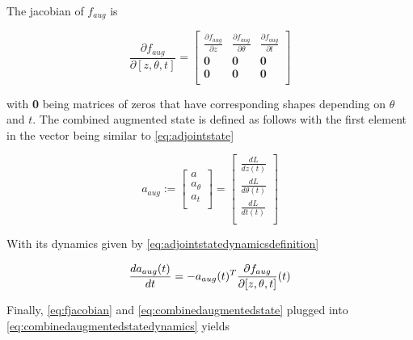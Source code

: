 \documentclass[10pt]{reportMaster}
\begin{document}
The jacobian of $f_{aug}$ is 

\begin{equation}
\label{eq:fjacobian}
\frac{\partial f_{aug}}{\partial [z, \theta, t]} = 
\begin{bmatrix}
\frac{\partial f_{aug}}{\partial z} & \frac{\partial f_{aug}}{\partial \theta}  & \frac{\partial f_{aug}}{\partial t} \\
\textbf{0} & \textbf{0} & \textbf{0} \\
\textbf{0} & \textbf{0} & \textbf{0} \\
\end{bmatrix}
\end{equation}

with \textbf{0} being matrices of zeros that have corresponding shapes depending on $\theta$ and $t$. The combined augmented state is defined as follows with the first element in the vector being similar to \ref{eq:adjointstate}

\begin{equation}
\label{eq:combinedaugmentedstate}
a_{aug} := 
\begin{bmatrix}
a \\
a_{\theta} \\
a_{t} \\
\end{bmatrix} = 
\begin{bmatrix}
\frac{dL}{dz(t)} \\
\frac{dL}{d\theta(t)}  \\
\frac{dL}{dt(t)}  \\
\end{bmatrix}
\end{equation}

With its dynamics given by \ref{eq:adjointstatedynamicsdefinition}

\begin{equation}
\label{eq:combinedaugmentedstatedynamics}
 \frac{da_{aug}(t)}{dt} = -a_{aug}(t)^{T} \frac{\partial f_{aug}}{\partial [z, \theta, t]} (t) \\
\end{equation}

Finally, \ref{eq:fjacobian} and \ref{eq:combinedaugmentedstate}  plugged into \ref{eq:combinedaugmentedstatedynamics} yields
\end{document}
